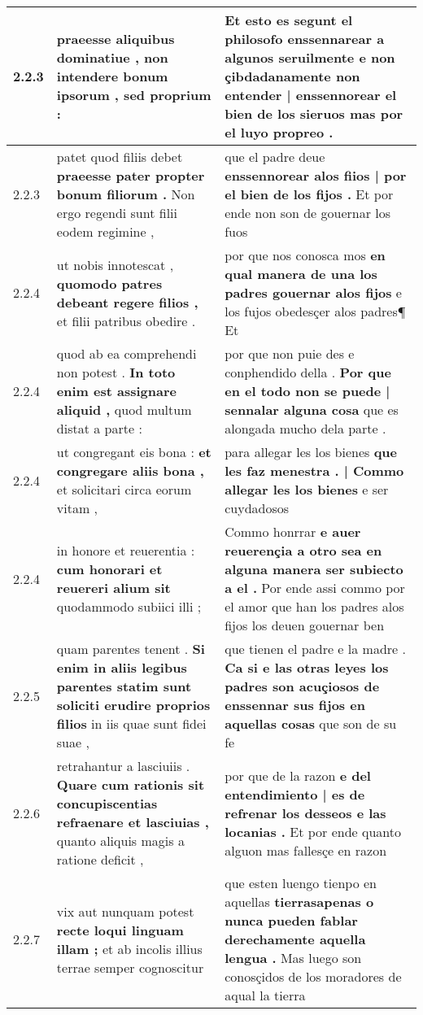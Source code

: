 \begin{tabular}{|p{1cm}|p{6.5cm}|p{6.5cm}|}
2.2.3 & praeesse aliquibus dominatiue , \textbf{ non intendere bonum ipsorum , } sed proprium : & Et esto es segunt el philosofo enssennarear a algunos seruilmente \textbf{ e non çibdadanamente non entender | enssennorear el bien de los sieruos } mas por el luyo propreo . \\\hline
2.2.3 & patet quod filiis debet \textbf{ praeesse pater propter bonum filiorum . } Non ergo regendi sunt filii eodem regimine , & que el padre deue \textbf{ enssennorear alos fiios | por el bien de los fijos . } Et por ende non son de gouernar los fuos \\\hline
2.2.4 & ut nobis innotescat , \textbf{ quomodo patres debeant regere filios , } et filii patribus obedire . & por que nos conosca mos \textbf{ en qual manera de una los padres gouernar alos fijos } e los fujos obedesçer alos padres¶ Et \\\hline
2.2.4 & quod ab ea comprehendi non potest . \textbf{ In toto enim est assignare aliquid , } quod multum distat a parte : & por que non puie des e conphendido della . \textbf{ Por que en el todo non se puede | sennalar alguna cosa } que es alongada mucho dela parte . \\\hline
2.2.4 & ut congregant eis bona : \textbf{ et congregare aliis bona , } et solicitari circa eorum vitam , & para allegar les los bienes \textbf{ que les faz menestra . | Commo allegar les los bienes } e ser cuydadosos \\\hline
2.2.4 & in honore et reuerentia : \textbf{ cum honorari et reuereri alium sit } quodammodo subiici illi ; & Commo honrrar \textbf{ e auer reuerençia a otro sea en alguna manera ser subiecto a el . } Por ende assi commo por el amor que han los padres alos fijos los deuen gouernar ben \\\hline
2.2.5 & quam parentes tenent . \textbf{ Si enim in aliis legibus parentes statim sunt soliciti erudire proprios filios } in iis quae sunt fidei suae , & que tienen el padre e la madre . \textbf{ Ca si e las otras leyes los padres son acuçiosos de enssennar sus fijos en aquellas cosas } que son de su fe \\\hline
2.2.6 & retrahantur a lasciuiis . \textbf{ Quare cum rationis sit concupiscentias refraenare et lasciuias , } quanto aliquis magis a ratione deficit , & por que de la razon \textbf{ e del entendimiento | es de refrenar los desseos e las locanias . } Et por ende quanto alguon mas fallesçe en razon \\\hline
2.2.7 & vix aut nunquam potest \textbf{ recte loqui linguam illam ; } et ab incolis illius terrae semper cognoscitur & que esten luengo tienpo en aquellas \textbf{ tierrasapenas o nunca pueden fablar derechamente aquella lengua . } Mas luego son conosçidos de los moradores de aqual la tierra \\\hline

\end{tabular}
